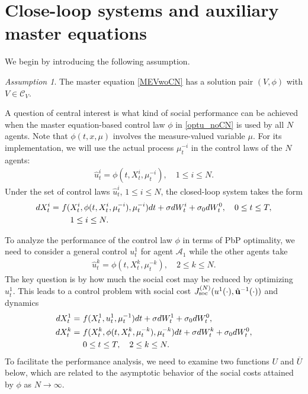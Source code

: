 \documentclass{amsart}
\theoremstyle{definition}
\theoremstyle{remark}
\newtheorem{assumption}[theorem]{Assumption}
\def\cal{\mathcal}
\numberwithin{equation}{section}
\begin{document}
\section{Close-loop systems and auxiliary master equations}
\label{sec:PbP}


We begin by introducing the following assumption.

\begin{assumption}\label{assum:meV}
The master equation \eqref{MEVwoCN} has a solution pair $(V, \phi)$ with $V\in {\cal C}_V$.
\end{assumption}



A question of central interest is what kind of social performance can be achieved  when the  master equation-based control law
 $\phi $ in \eqref{optu_noCN} is used by all $N$ agents. Note that $\phi(t, x, \mu)$ involves the measure-valued variable $\mu$. For
 its  implementation, we will use the actual process $\mu_t^{-i}$ in  the control laws of the $N$ agents:
\begin{align}
\hat u_t^i= \phi(t, X_t^i, \mu_t^{-i}), \quad 1\le i\le N.
\end{align}
Under the set of control laws $\hat u_t^i$, $1\le i\le N$,
the closed-loop system takes the form
\begin{align}
dX_t^i=\ & f(X_t^i, \phi(t, X_t^i,\mu_t^{-i}), \mu_{t}^{-i})dt+
\sigma dW_t^i +\sigma_0 dW_t^0 , \quad 0\le t\le T, \label{allXphi0} \\
&\quad 1\le i\le N. \notag
\end{align}

 To analyze the performance of the control law $\phi$ in terms of  PbP optimality, we need to consider a general control
 $u_t^1$ for agent ${\cal A}_1$ while the other agents take
 \begin{align}
\hat u_t^k= \phi(t, X_t^k,\mu^{-k}_t), \quad 2\le k\le N.
 \end{align}
The key question is by how much the social cost may be reduced by optimizing $u_t^1$.
This leads to  a control problem with social cost $J_{\rm soc}^{(N)}(u^1(\cdot), \hat {\mathbf u}^{-1} (\cdot)) $ and   dynamics
\begin{align}
dX_t^1=\ & f(X_t^1, u_t^1, \mu_{t}^{-1})dt+
\sigma dW_t^1+\sigma_0 dW_t^0,  \label{X1u} \\
dX_t^k=\ & f(X_t^k, \phi(t, X_t^k,\mu_t^{-k}), \mu_{t}^{-k})dt+
\sigma dW_t^k +\sigma_0 dW_t^0 ,   \label{Xkuhat} \\
& 0\le t\le T, \quad 2\le k\le N.   \notag
\end{align}
  To facilitate the performance analysis, we need to examine two functions $U$ and $\overline U$ below, which are  related to the asymptotic behavior of the social costs attained by $\phi$ as $N\to \infty$.
\end{document}
